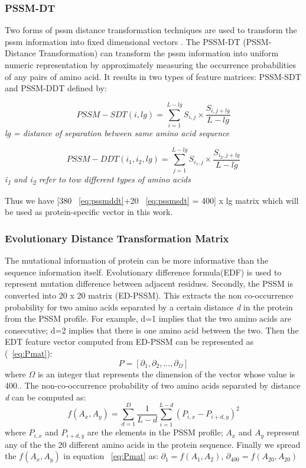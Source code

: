 \subsubsection{PSSM-DT}
Two forms of \acrshort{pssm} distance transformation techniques are used to transform the \acrshort{pssm} information into fixed dimensional vectors \cite{Xu2015}. The PSSM-DT (PSSM-Distance Transformation) can transform the \acrshort{pssm} information into uniform numeric representation by approximately measuring the occurrence probabilities of any pairs of amino acid. It results in two types of feature matrices: PSSM-SDT and PSSM-DDT defined by:

\begin{equation}
  PSSM-SDT(i,lg) = \sum_{i=1}^{L-lg} S_{i,j} \times \frac{ S_{i,j+lg} }{L-lg} 
  \label{eq:pssmsdt}
\end{equation}
\textit{\center lg =  distance of separation between same amino acid sequence}

\begin{equation}
  PSSM-DDT(i_1,i_2, lg) = \sum_{j=1}^{L-lg} S_{i_1,j} \times \frac{ S_{i_2,j+lg} }{ L-lg} 
  \label{eq:pssmddt}
\end{equation}
\textit{\centering i\textsubscript{1} and i\textsubscript{2} refer to tow different types of amino acids}

Thus we have [380 ~\eqref{eq:pssmddt}+20 ~\eqref{eq:pssmsdt} = 400] x lg matrix which will be used as protein-specific vector in this work.

\subsubsection{Evolutionary Distance Transformation Matrix}
The mutational information of protein can be more informative than the sequence information itself\cite{Zhang2014}. Evolutionary difference formula(EDF) is used to represent mutation difference between adjacent residues. Secondly, the PSSM is converted into 20 x 20 matrix (ED-PSSM). This extracts the non co-occurrence probability for two amino acids separated by a certain distance \textit{d} in the protein from the PSSM profile. For example, d=1 implies that the two amino acids are consecutive; d=2 implies that there is one amino acid between the two. Then the EDT feature vector computed from ED-PSSM can be represented as (~\ref{eq:Pmat}): 
\begin{equation}
  \label{eq:Pmat}
  P = [ \partial_1 ,\partial_2, \dots, \partial_\Omega]
\end{equation}
where $\Omega$ is an integer that represents the dimension of the vector whose value is 400.. The non-co-occurrence probability of two amino acids separated by distance \textit{d} can be computed as:
\begin{equation}
  f(A_x,A_y) = \sum_{d=1}^{D} \frac{1}{L-d} \sum_{i=1}^{L-d} (P_{i,x} - P_{i+d,y})^2
  \label{eq:edt}
\end{equation}
where $P_{i,x}$ and $P_{i+d,y}$ are the elements in the PSSM profile; $A_x$ and $A_y$ represent any of the the 20 different amino acids in the protein sequence. Finally we spread the $f(A_x,A_y)$ in equation ~\ref{eq:Pmat} as:
$ \partial_1 = f(A_1,A_2) $, 
$ \partial_{400} = f(A_20, A_20) $


